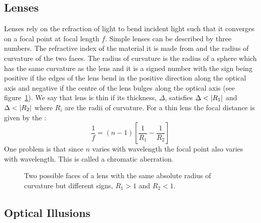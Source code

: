     \subsection{Lenses}
    Lenses rely on the refraction of light to bend incident light such that it converges on a focal point at focal length \(f\).
    Simple lenses can be described by three numbers.
    The refractive index of the material it is made from and the radius of curvature of the two faces.
    The radius of curvature is the radius of a sphere which has the same curvature as the lens and it is a signed number with the sign being positive if the edges of the lens bend in the positive direction along the optical axis and negative if the centre of the lens bulges along the optical axis (see figure~\ref{fig:radii of curvature}).
    We say that lens is thin if its thickness, \(\Delta\), satisfies \(\Delta < \abs{R_1}\) and \(\Delta < \abs{R_2}\) where \(R_i\) are the radii of curvature.
    For a thin lens the focal distance is given by the :
    \[\frac{1}{f} = (n - 1) \left[ \frac{1}{R_1} - \frac{1}{R_2} \right]\]
    One problem is that since \(n\) varies with wavelength the focal point also varies with wavelength.
    This is called a chromatic aberration.
    \begin{figure}[htb]
        \centering
        \caption{Two possible faces of a lens with the same absolute radius of curvature but different signs, \(R_1 > 1\) and \(R_2 < 1\).}
        \label{fig:radii of curvature}
    \end{figure}

    \subsection{Optical Illusions}
